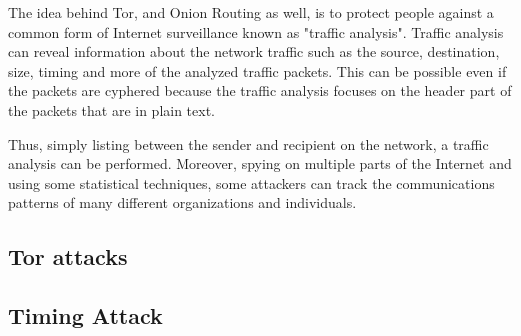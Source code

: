 The idea behind Tor, and Onion Routing as well, is to protect people
against a common form of Internet surveillance known as "traffic
analysis". Traffic analysis can reveal information about the network
traffic such as the source, destination, size, timing and more of the
analyzed traffic packets. This can be possible even if the packets are
cyphered because the traffic analysis focuses on the header part of the
packets that are in plain text. 

Thus, simply listing between the sender and recipient on the network,
a traffic analysis can be performed. Moreover, spying on multiple parts
of the Internet and using some statistical techniques, some attackers can
track the communications patterns of many different organizations and
individuals.

\subsection{Tor attacks}

\subsection{Timing Attack}
